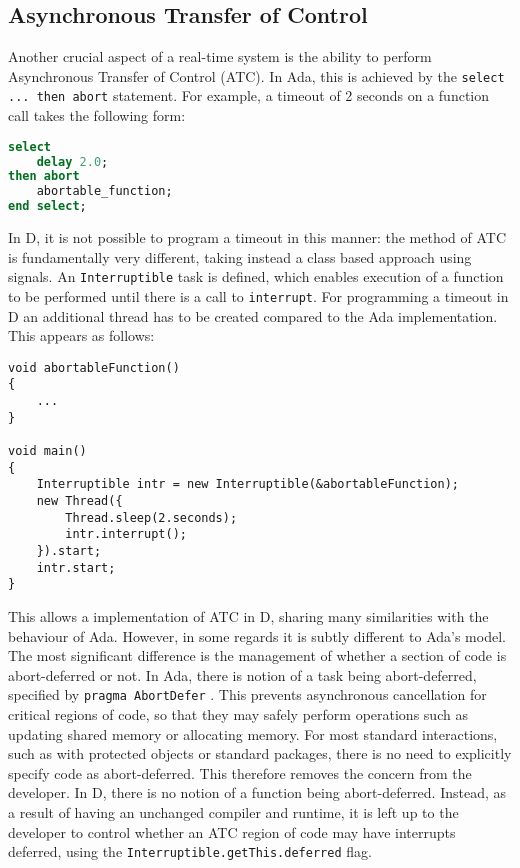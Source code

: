 \subsection{Asynchronous Transfer of Control}
Another crucial aspect of a real-time system is the ability to perform
Asynchronous Transfer of Control (ATC). In Ada, this is achieved by the 
\texttt{select ... then abort} statement. 
For example, a timeout of 2 seconds on a function call takes the 
following form: 
\begin{lstlisting}[basicstyle=\small,language=Ada]
select 
    delay 2.0; 
then abort
    abortable_function; 
end select; 
\end{lstlisting}
In D, it is not possible to program a timeout in this manner: the method of ATC
is fundamentally very different, taking instead a class based approach using 
signals. An \texttt{Interruptible} task is defined, which enables
execution of a function to be performed until there is a call to
\texttt{interrupt}. For programming a timeout in D an additional
thread has to be created compared to the Ada implementation. 
This appears as follows: 
\begin{lstlisting}[basicstyle=\small]
void abortableFunction()
{
    ...
}

void main()
{
    Interruptible intr = new Interruptible(&abortableFunction); 
    new Thread({
        Thread.sleep(2.seconds); 
        intr.interrupt(); 
    }).start;
    intr.start; 
}
\end{lstlisting}
This allows a implementation of ATC in D, sharing many similarities with the
behaviour of Ada. However, in some regards it is subtly different to 
Ada's model. The most significant difference is the management of
whether a section of code is abort-deferred or not. In Ada, there is notion of
a task being abort-deferred, specified by \texttt{pragma Abort\textunderscore{}Defer}
\cite{atc-article}.
This prevents asynchronous cancellation for
critical regions of code, so that they may safely perform operations such as
updating shared memory or allocating memory. 
For most standard interactions, such as with protected objects or standard
packages, there is no need to explicitly specify code as abort-deferred. This
therefore removes the concern from the developer. In D, there is no notion of a
function being abort-deferred. Instead, as a result of having an unchanged
compiler and runtime, it is left up to the developer to
control whether an ATC region of code may have interrupts deferred, using the 
\texttt{Interruptible.getThis.deferred} flag. 

